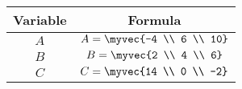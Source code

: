 \begin{center}
    \begin{tabular}{|c|c|} 
        \hline
            \textbf{Variable}  & \textbf{Formula} \\ 
        \hline
            $A$   & $A = \myvec{-4 \\ 6 \\ 10}$ \\ 
        \hline
            $B$   &  $B = \myvec{2 \\ 4 \\ 6}$\\ 
        \hline
            $C$   & $C = \myvec{14 \\ 0 \\ -2}$ \\ 
        \hline
        
         \end{tabular}
\end{center}  

